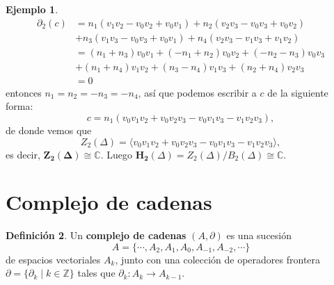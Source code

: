 \documentclass[12pt]{book}
\newtheorem{theorem}{Teorema}[section]
\theoremstyle{definition}
\newtheorem{definition}[theorem]{Definición}
\newtheorem{example}[theorem]{Ejemplo}
\newcounter{in}
\newcounter{ini}
\begin{document}
\begin{example}
\begin{align*}
   \partial_{2}(c)&=n_{1}(v_{1}v_{2}-v_{0}v_{2}+v_{0}v_{1})+n_{2}(v_{2}v_{3}-v_{0}v_{3}+v_{0}v_{2})\\
   &+n_{3}(v_{1}v_{3}-v_{0}v_{3}+v_{0}v_{1})+n_{4}(v_{2}v_{3}-v_{1}v_{3}+v_{1}v_{2})\\
   &=(n_{1}+n_{3})v_{0}v_{1}+(-n_{1}+n_{2})v_{0}v_{2}+(-n_{2}-n_{3})v_{0}v_{3}\\
   & +(n_{1}+n_{4})v_{1}v_{2}+(n_{3}-n_{4})v_{1}v_{3}+(n_{2}+n_{4})v_{2}v_{3}\\
   &=0
 \end{align*}
 entonces $n_{1}=n_{2}=-n_{3}=-n_{4}$, así que podemos escribir a $c$
 de la siguiente forma: 
 $$c=n_{1}(v_{0}v_{1}v_{2}+v_{0}v_{2}v_{3}-v_{0}v_{1}v_{3}-v_{1}v_{2}v_{3}),$$
 de donde vemos que
 $$Z_{2}(\Delta)=\langle v_{0}v_{1}v_{2}+v_{0}v_{2}v_{3}-v_{0}v_{1}v_{3}-v_{1}v_{2}v_{3}\rangle,$$
 es decir, $\boldsymbol{Z_{2}(\Delta)}\cong \mathbb{C}$. Luego  $\boldsymbol{H_{2}}(\Delta)=Z_{2}(\Delta)/B_{2}(\Delta)\cong\mathbb{C}$.
\end{example}

\section{Complejo de cadenas}
\label{com-cad}

\begin{definition}
  Un \textbf{complejo de cadenas} $(A,\partial)$ es una sucesión
  $$A=\{\cdots,A_{2},A_{1},A_{0},A_{-1},A_{-2},\cdots\}$$
  de espacios vectoriales $A_{k}$, junto con una colección de
  operadores frontera $\partial=\{\partial_{k}\mid k \in \mathbb{Z}\}$
  tales que $\partial_{k}:A_{k}\rightarrow A_{k-1}$.
\end{definition}

\end{document}
